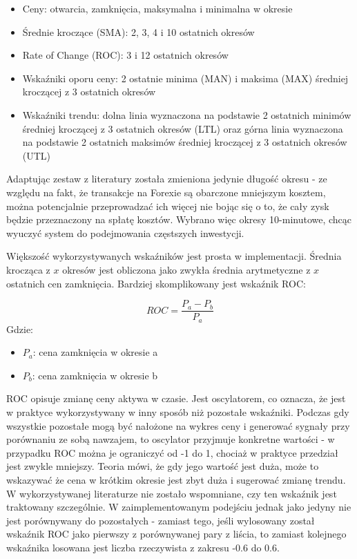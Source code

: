 \documentclass[twoside]{iisthesis}
\begin{document}
\begin{itemize}
	\item Ceny: otwarcia, zamknięcia, maksymalna i minimalna w okresie
	\item Średnie kroczące (SMA): 2, 3, 4 i 10 ostatnich okresów
	\item Rate of Change (ROC): 3 i 12 ostatnich okresów
	\item Wskaźniki oporu ceny: 2 ostatnie minima (MAN) i maksima (MAX) średniej kroczącej z 3 ostatnich okresów
	\item Wskaźniki trendu: dolna linia wyznaczona na podstawie 2 ostatnich minimów średniej kroczącej z 3 ostatnich okresów (LTL) oraz górna linia wyznaczona na podstawie 2 ostatnich maksimów średniej kroczącej z 3 ostatnich okresów (UTL)
\end{itemize}

Adaptując zestaw z literatury została zmieniona jedynie długość okresu - ze względu na fakt, że transakcje na Forexie są obarczone mniejszym kosztem, można potencjalnie przeprowadzać ich więcej nie bojąc się o to, że cały zysk będzie przeznaczony na spłatę kosztów. Wybrano więc okresy 10-minutowe, chcąc wyuczyć system do podejmowania częstszych inwestycji.

Większość wykorzystywanych wskaźników jest prosta w implementacji. Średnia krocząca z $x$ okresów jest obliczona jako zwykła średnia arytmetyczne z $x$ ostatnich cen zamknięcia. Bardziej skomplikowany jest wskaźnik ROC:

\[ROC= \frac{P_{a} - P_{b}}{P_{a}}\]
Gdzie:
\begin{itemize}[label=]
	\item $P_a$: cena zamknięcia w okresie a
	\item $P_b$: cena zamknięcia w okresie b
\end{itemize}

ROC opisuje zmianę ceny aktywa w czasie. Jest oscylatorem, co oznacza, że jest w praktyce wykorzystywany w inny sposób niż pozostałe wskaźniki. Podczas gdy wszystkie pozostałe mogą być nałożone na wykres ceny i generować sygnały przy porównaniu ze sobą nawzajem, to oscylator przyjmuje konkretne wartości - w przypadku ROC można je ograniczyć od -1 do 1, chociaż w praktyce przedział jest zwykle mniejszy. Teoria mówi, że gdy jego wartość jest duża, może to wskazywać że cena w krótkim okresie jest zbyt duża i sugerować zmianę trendu. W wykorzystywanej literaturze nie zostało wspomniane, czy ten wskaźnik jest traktowany szczególnie. W zaimplementowanym podejściu jednak jako jedyny nie jest porównywany do pozostałych - zamiast tego, jeśli wylosowany został wskaźnik ROC jako pierwszy z porównywanej pary z liścia, to zamiast kolejnego wskaźnika losowana jest  liczba rzeczywista z zakresu -0.6 do 0.6. 
\end{document}

